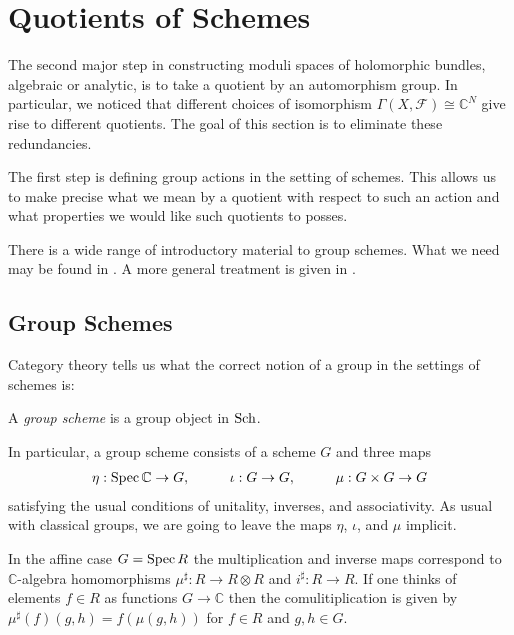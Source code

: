 \documentclass[12pt]{ociamthesis}  %
\begin{document}
\section{Quotients of Schemes}

The second major step in constructing moduli spaces of holomorphic
bundles, algebraic or analytic, is to take a quotient by an automorphism
group. In particular, we noticed that different choices of isomorphism
$\Gamma(X,\mathscr F)\cong\mathbb{C}^N$ give rise to different quotients.
The goal of this section is to eliminate these redundancies.

The first step is defining group actions in the setting of schemes.
This allows us to make precise what we mean by a quotient with
respect to such an action and what properties we would like such
quotients to posses.

There is a wide range of introductory material to group schemes.
What we need may be found in \cite{hoskins2016}. A more general
treatment is given in \cite{milne2017}.

\subsection{Group Schemes}

Category theory tells us what the correct notion of a group in the
settings of schemes is:

\begin{definition}
  A \emph{group scheme} is a group object in $\operatorname{Sch}$.
\end{definition}
In particular, a group scheme consists of a scheme $G$ and three maps
\begin{align}\label{eq:group_maps}
  \eta:\operatorname{Spec}\mathbb{C}\to G,\hspace{1cm}
  \iota:G\to G,\hspace{1cm}
  \mu:G\times G\to G
\end{align}
satisfying the usual conditions of unitality, inverses, and associativity.
As usual with classical groups, we are going to leave the maps
$\eta$, $\iota$, and $\mu$ implicit.

In the affine case $G = \operatorname{Spec} R$ the multiplication and inverse maps
correspond to $\mathbb{C}$-algebra homomorphisms
$\mu^\sharp : R \to R\otimes R$ and $i^\sharp : R\to R$.
If one thinks of elements $f\in R$ as functions $G\to\mathbb C$
then the comulitiplication is given by $\mu^\sharp(f)(g,h) = f(\mu(g,h))$
for $f\in R$ and $g,h\in G$.
\end{document}
